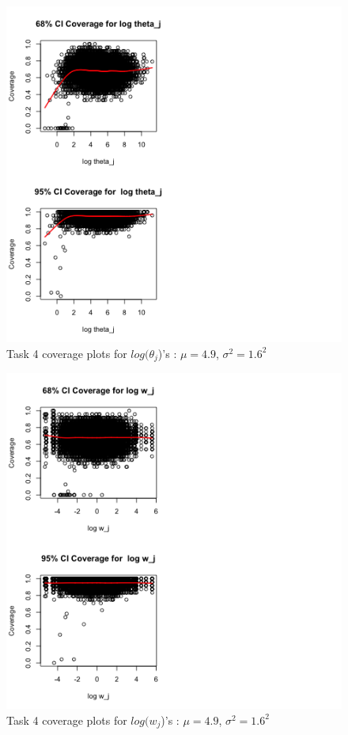 \documentclass[paper=a4, fontsize=11pt]{scrartcl}
\begin{document}
\begin{figure}[h!]
  \caption{Task 4 coverage plots for $log(\theta_{j}$)'s : $\mu = 4.9$, $\sigma^2 = 1.6^2$}
  \centering
	\includegraphics[scale=1, trim = 0 0 200 0]{keskici_wxiao_ps2_task4_plot7.png}
\end{figure}

\begin{figure}[h!]
  \caption{Task 4 coverage plots for $log(w_{j}$)'s : $\mu = 4.9$, $\sigma^2 = 1.6^2$}
  \centering
	\includegraphics[scale=1, trim = 0 0 200 0]{keskici_wxiao_ps2_task4_plot8.png}
\end{figure}
\end{document}
